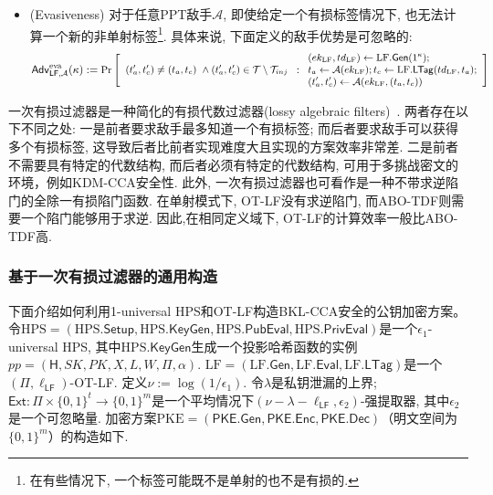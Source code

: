 \begin{definition}[一次有损过滤器]
\begin{itemize}[noitemsep,topsep=0pt]
\item (Evasiveness) 对于任意PPT敌手$\mathcal{A}$, 即使给定一个有损标签情况下, 也无法计算一个新的非单射标签\footnote{在有些情况下, 一个标签可能既不是单射的也不是有损的.}. 具体来说, 下面定义的敌手优势是可忽略的:
 \begin{displaymath}
 \small
 \mathsf{Adv}_{\mathsf{LF},\mathcal{A}}^{\textup{eva}}(\kappa):=\textup{Pr}\left[
 \begin{array}{l}
 (t_a',t_c')\neq (t_a,t_c)~\land
 (t_a',t_c')\in\mathcal{T}\setminus\mathcal{T}_{inj}
\end{array}:
 \begin{array}{l}
 (ek_{\text{LF}},td_{\text{LF}})\leftarrow \text{LF}.\mathsf{Gen}(1^\kappa);\\
 t_a\leftarrow\mathcal{A}(ek_{\text{LF}}); t_c \leftarrow \text{LF}.\mathsf{LTag}(td_{\text{LF}},t_a);\\
 (t_a',t_c')\leftarrow\mathcal{A}(ek_{\text{LF}},(t_a,t_c))\\
 \end{array}
 \right]
 \end{displaymath}
\end{itemize}
\end{definition}

\begin{note}
一次有损过滤器是一种简化的有损代数过滤器(lossy algebraic filters)~\cite{Hofheinz-EUROCRYPT-2013}. 两者存在以下不同之处: 一是前者要求敌手最多知道一个有损标签; 而后者要求敌手可以获得多个有损标签, 这导致后者比前者实现难度大且实现的方案效率非常差. 二是前者不需要具有特定的代数结构, 而后者必须有特定的代数结构, 可用于多挑战密文的环境，例如KDM-CCA安全性. 此外, 一次有损过滤器也可看作是一种不带求逆陷门的全除一有损陷门函数. 在单射模式下, OT-LF没有求逆陷门, 而ABO-TDF则需要一个陷门能够用于求逆. 因此,在相同定义域下, OT-LF的计算效率一般比ABO-TDF高.
\end{note}

\subsubsection{基于一次有损过滤器的通用构造}
下面介绍如何利用1-universal HPS和OT-LF构造BKL-CCA安全的公钥加密方案。令$\text{HPS} = (\text{HPS}.\mathsf{Setup}, \text{HPS}.\mathsf{KeyGen}, \text{HPS}.\mathsf{PubEval}, \text{HPS}.\mathsf{PrivEval})$是一个$\epsilon_1$-universal HPS, 其中$\text{HPS}.\mathsf{KeyGen}$生成一个投影哈希函数的实例$pp = (\mathsf{H}, SK, PK, X, L, W, \Pi, \alpha)$. $\text{LF}=(\text{LF}.\mathsf{Gen},\text{LF}.\mathsf{Eval}, \text{LF}.\mathsf{LTag})$是一个$(\Pi,\ell_\mathsf{LF})$-OT-LF. 定义$\nu:=\log(1/\epsilon_1)$. 令$\lambda$是私钥泄漏的上界; $\mathsf{Ext}: \Pi \times \{0, 1\}^t \rightarrow \{0,1\}^m$是一个平均情况下$(\nu-\lambda-\ell_{\mathsf{LF}},\epsilon_2)$-强提取器, 其中$\epsilon_2$是一个可忽略量. 加密方案$\text{PKE}=(\mathsf{PKE.Gen},\mathsf{PKE.Enc},\mathsf{PKE.Dec})$（明文空间为$\{0,1\}^m$）的构造如下.

